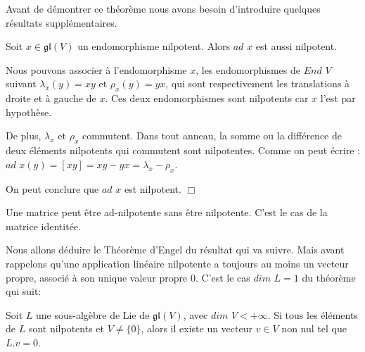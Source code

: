 \documentclass[a4paper,openany,12pt]{report}
\newcommand{\gl}{\mathfrak{gl}}
\theoremstyle{break}
{\theorembodyfont{\upshape}
\newtheorem*{rmq}{Remarque :}
\newtheorem*{prv}{Preuve :}
\newtheorem*{ex}{Exemples :}
\newtheorem{exe}{Exemple : }
\newtheorem*{nota}{Notation :}}
\begin{document}
\quad Avant de démontrer ce théorème nous avons besoin d’introduire quelques résultats supplémentaires.

\begin{lem}\label{lem:E1}
\quad Soit $x \in \gl(V)$ un endomorphisme nilpotent. Alors $ad$ $x$ est aussi nilpotent. 
\end{lem}

\begin{prv}
\quad Nous pouvons associer à l'endomorphisme $x$, les endomorphismes de $End$ $V$ suivant $\lambda_{x}(y)=xy$ et $\rho_{x}(y)=yx$, qui sont respectivement les translations à droite et à gauche de $x$. Ces deux endomorphismes sont nilpotents car $x$ l'est par hypothèse.

De plus, $\lambda_{x}$ et $\rho_{x}$ commutent. Dans tout anneau, la somme ou la différence de deux éléments nilpotents qui commutent sont nilpotentes. Comme on peut écrire :
$ad$ $x(y)= [xy] = xy-yx = \lambda_{x} - \rho_{x}$.

On peut conclure que $ad$ $x$ est nilpotent. $\Box$
\end{prv}

\begin{rmq}
\quad Une matrice peut être ad-nilpotente sans être nilpotente. C'est le cas de la matrice identitée. 
\end{rmq}

Nous allons déduire le Théorème d'Engel du résultat qui va suivre. Mais avant rappelons qu'une application linéaire nilpotente a toujours au moins un vecteur propre, associé à son unique valeur propre $0$. C'est le cas $dim$  $L = 1$ du théorème qui suit:

\begin{thm}\label{thm:E1}
\quad Soit $L$ une sous-algèbre de Lie de $\gl (V)$, avec $dim$ $V < + \infty$. Si tous les éléments de $L$ sont nilpotents et $V  \neq  \{0\}$, alors il existe un vecteur $v \in V$ non nul tel que $L.v = 0$.
\end{thm}
\end{document}
